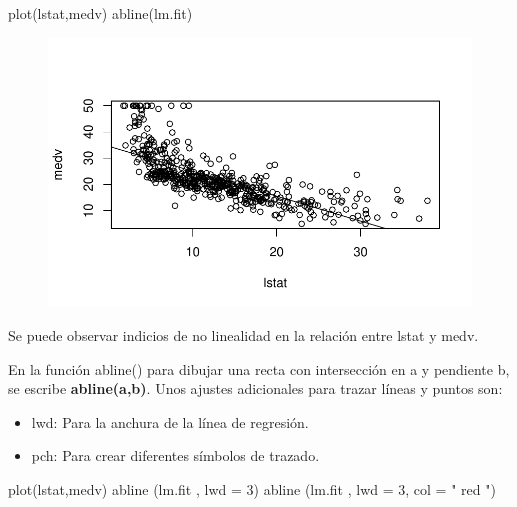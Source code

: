 \documentclass[
  letterpaper,
  DIV=11,
  numbers=noendperiod]{scrartcl}
\newenvironment{Shaded}{\begin{snugshade}}{\end{snugshade}}
\newcommand{\AttributeTok}[1]{\textcolor[rgb]{0.40,0.45,0.13}{#1}}
\newcommand{\DecValTok}[1]{\textcolor[rgb]{0.68,0.00,0.00}{#1}}
\newcommand{\FunctionTok}[1]{\textcolor[rgb]{0.28,0.35,0.67}{#1}}
\newcommand{\NormalTok}[1]{\textcolor[rgb]{0.00,0.23,0.31}{#1}}
\newcommand{\StringTok}[1]{\textcolor[rgb]{0.13,0.47,0.30}{#1}}
\begin{document}
\begin{Shaded}
\begin{Highlighting}[]
\FunctionTok{plot}\NormalTok{(lstat,medv)}
\FunctionTok{abline}\NormalTok{(lm.fit)}
\end{Highlighting}
\end{Shaded}

\begin{figure}[H]

{\centering \includegraphics{Resumen-2---3_files/figure-pdf/unnamed-chunk-8-1.pdf}

}

\end{figure}

Se puede observar indicios de no linealidad en la relación entre lstat y
medv.

En la función abline() para dibujar una recta con intersección en a y
pendiente b, se escribe \textbf{abline(a,b)}. Unos ajustes adicionales
para trazar líneas y puntos son:

\begin{itemize}
\item
  lwd: Para la anchura de la línea de regresión.
\item
  pch: Para crear diferentes símbolos de trazado.
\end{itemize}

\begin{Shaded}
\begin{Highlighting}[]
\FunctionTok{plot}\NormalTok{(lstat,medv)}
\FunctionTok{abline}\NormalTok{ (lm.fit , }\AttributeTok{lwd =} \DecValTok{3}\NormalTok{)}
\FunctionTok{abline}\NormalTok{ (lm.fit , }\AttributeTok{lwd =} \DecValTok{3}\NormalTok{, }\AttributeTok{col =} \StringTok{" red "}\NormalTok{)}
\end{Highlighting}
\end{Shaded}
\end{document}
